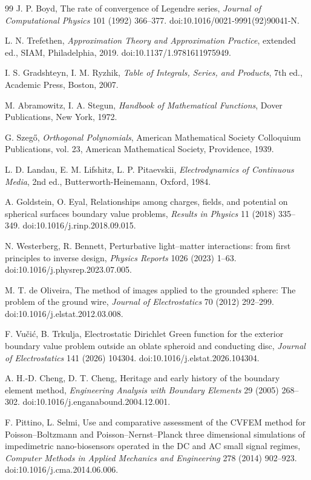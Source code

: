 \documentclass[preprint,12pt]{elsarticle}
\begin{document}
\begin{thebibliography}{99}
J. P. Boyd, The rate of convergence of Legendre series, \textit{Journal of Computational Physics} 101 (1992) 366--377. doi:10.1016/0021-9991(92)90041-N.

L. N. Trefethen, \textit{Approximation Theory and Approximation Practice}, extended ed., SIAM, Philadelphia, 2019. doi:10.1137/1.9781611975949.

I. S. Gradshteyn, I. M. Ryzhik, \textit{Table of Integrals, Series, and Products}, 7th ed., Academic Press, Boston, 2007.

M. Abramowitz, I. A. Stegun, \textit{Handbook of Mathematical Functions}, Dover Publications, New York, 1972.

G. Szeg{\H o}, \textit{Orthogonal Polynomials}, American Mathematical Society Colloquium Publications, vol. 23, American Mathematical Society, Providence, 1939.

L. D. Landau, E. M. Lifshitz, L. P. Pitaevskii, \textit{Electrodynamics of Continuous Media}, 2nd ed., Butterworth-Heinemann, Oxford, 1984.

A. Goldstein, O. Eyal, Relationships among charges, fields, and potential on spherical surfaces boundary value problems, \textit{Results in Physics} 11 (2018) 335--349. doi:10.1016/j.rinp.2018.09.015.

N. Westerberg, R. Bennett, Perturbative light--matter interactions: from first principles to inverse design, \textit{Physics Reports} 1026 (2023) 1--63. doi:10.1016/j.physrep.2023.07.005.

M. T. de Oliveira, The method of images applied to the grounded sphere: The problem of the ground wire, \textit{Journal of Electrostatics} 70 (2012) 292--299. doi:10.1016/j.elstat.2012.03.008.

F. Vu\v{c}i\'c, B. Trkulja, Electrostatic Dirichlet Green function for the exterior boundary value problem outside an oblate spheroid and conducting disc, \textit{Journal of Electrostatics} 141 (2026) 104304. doi:10.1016/j.elstat.2026.104304.

A. H.-D. Cheng, D. T. Cheng, Heritage and early history of the boundary element method, \textit{Engineering Analysis with Boundary Elements} 29 (2005) 268--302. doi:10.1016/j.enganabound.2004.12.001.

F. Pittino, L. Selmi, Use and comparative assessment of the CVFEM method for Poisson--Boltzmann and Poisson--Nernst--Planck three dimensional simulations of impedimetric nano-biosensors operated in the DC and AC small signal regimes, \textit{Computer Methods in Applied Mechanics and Engineering} 278 (2014) 902--923. doi:10.1016/j.cma.2014.06.006.


\end{thebibliography}
\end{document}
